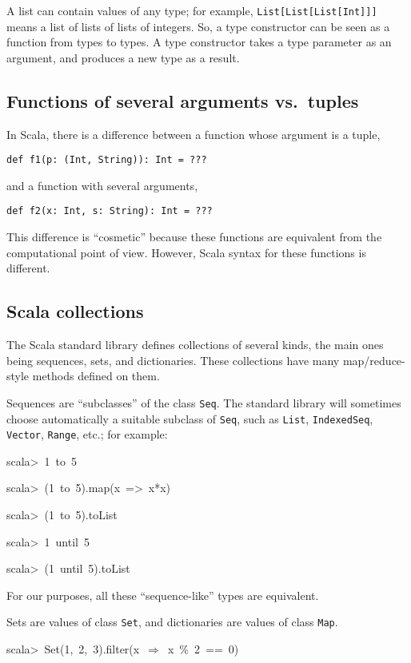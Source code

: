 A list can contain values of any type; for example, \texttt{}\lstinline!List[List[List[Int]]]!
means a list of lists of lists of integers. So, a type constructor
can be seen as a function from types to types. A type constructor
takes a type parameter as an argument, and produces a new type as
a result.

\subsection{Functions of several arguments vs.~tuples}

In Scala, there is a difference between a function whose argument
is a tuple,
\begin{lstlisting}
def f1(p: (Int, String)): Int = ???
\end{lstlisting}
and a function with several arguments,
\begin{lstlisting}
def f2(x: Int, s: String): Int = ???
\end{lstlisting}
This difference is ``cosmetic'' because these functions are equivalent
from the computational point of view. However, Scala syntax for these
functions is different.

\subsection{Scala collections}

The Scala standard library defines collections of several kinds, the
main ones being sequences, sets, and dictionaries. These collections
have many map/reduce-style methods defined on them.

Sequences are ``subclasses'' of the class \texttt{Seq}. The standard
library will sometimes choose automatically a suitable subclass of
\texttt{Seq}, such as \texttt{List}, \texttt{IndexedSeq}, \texttt{Vector},
\texttt{Range}, etc.; for example:
\begin{lyxcode}
scala>~1~to~5

scala>~(1~to~5).map(x~=>~x{*}x)

scala>~(1~to~5).toList

scala>~1~until~5

scala>~(1~until~5).toList
\end{lyxcode}
For our purposes, all these ``sequence-like'' types are equivalent.

Sets are values of class \texttt{Set}, and dictionaries are values
of class \texttt{Map}.
\begin{lyxcode}
scala>~Set(1,~2,~3).filter(x~$\Rightarrow$~x~\%~2~==~0)
\end{lyxcode}

